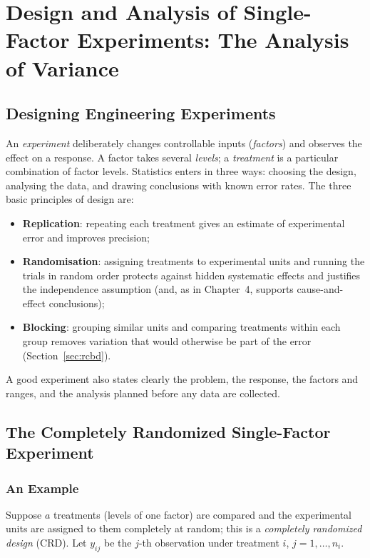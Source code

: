 \chapter{Design and Analysis of Single-Factor Experiments: The Analysis of Variance}

\section{Designing Engineering Experiments}

An \emph{experiment} deliberately changes controllable inputs (\emph{factors}) and observes the effect on a response. A factor takes several \emph{levels}; a \emph{treatment} is a particular combination of factor levels. Statistics enters in three ways: choosing the design, analysing the data, and drawing conclusions with known error rates. The three basic principles of design are:
\begin{itemize}
  \item \textbf{Replication}: repeating each treatment gives an estimate of experimental error and improves precision;
  \item \textbf{Randomisation}: assigning treatments to experimental units and running the trials in random order protects against hidden systematic effects and justifies the independence assumption (and, as in Chapter~4, supports cause-and-effect conclusions);
  \item \textbf{Blocking}: grouping similar units and comparing treatments within each group removes variation that would otherwise be part of the error (Section~\ref{sec:rcbd}).
\end{itemize}
A good experiment also states clearly the problem, the response, the factors and ranges, and the analysis planned before any data are collected.

\section{The Completely Randomized Single-Factor Experiment}

\subsection{An Example}

Suppose $a$ treatments (levels of one factor) are compared and the experimental units are assigned to them completely at random; this is a \emph{completely randomized design} (CRD). Let $y_{ij}$ be the $j$-th observation under treatment $i$, $j=1,\dots,n_i$.

